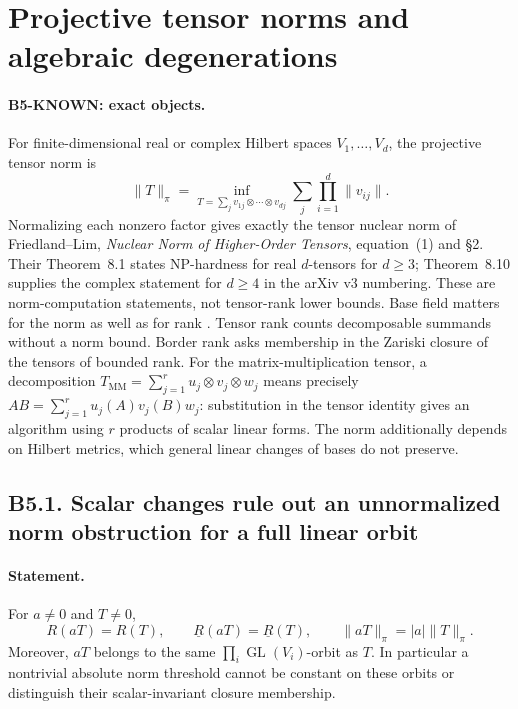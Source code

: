 \section{Projective tensor norms and algebraic degenerations}
\label{sec:bridge-norm}

\paragraph{B5-KNOWN: exact objects.}
For finite-dimensional real or complex Hilbert spaces $V_1,\ldots,V_d$,
the projective tensor norm is
\[
 \|T\|_\pi=
 \inf_{T=\sum_j v_{1j}\otimes\cdots\otimes v_{dj}}
        \sum_j\prod_{i=1}^d\|v_{ij}\|.
\]
Normalizing each nonzero factor gives exactly the tensor nuclear norm
of Friedland--Lim, \emph{Nuclear Norm of Higher-Order Tensors},
equation~(1) and \S2.  Their Theorem~8.1 states NP-hardness for real
$d$-tensors for $d\geq3$; Theorem~8.10 supplies the complex statement
for $d\geq4$ in the arXiv v3 numbering.  These are norm-computation
statements, not tensor-rank lower bounds.  Base field matters for the
norm as well as for rank \cite{friedland-lim2018}.
Tensor rank counts decomposable summands without a norm bound.
Border rank asks membership in the Zariski closure of the tensors of
bounded rank.  For the matrix-multiplication tensor, a decomposition
$T_{\mathrm{MM}}=\sum_{j=1}^r u_j\otimes v_j\otimes w_j$ means precisely
$AB=\sum_{j=1}^r u_j(A)v_j(B)w_j$: substitution in the tensor identity
gives an algorithm using $r$ products of scalar linear forms.
The norm additionally depends on Hilbert metrics, which general linear
changes of bases do not preserve.

\subsection*{B5.1. Scalar changes rule out an unnormalized norm obstruction for a full linear orbit}
\paragraph{Statement.}
For $a\neq0$ and $T\neq0$,
\[
 R(aT)=R(T),\qquad \underline R(aT)=\underline R(T),
 \qquad \|aT\|_\pi=|a|\|T\|_\pi.
\]
Moreover, $aT$ belongs to the same
$\prod_i\operatorname{GL}(V_i)$-orbit as $T$.  In particular a
nontrivial absolute norm threshold cannot be constant on these orbits
or distinguish their scalar-invariant closure membership.

